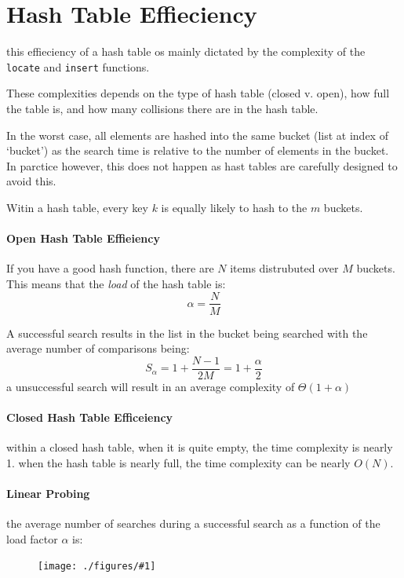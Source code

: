 \documentclass[12pt]{book}
\title{\coursetitle\linebreak\lecturename}
\author{\\Cain Susko\\ 
           \\ \\ \\
      Queen's University 
    \\School of Computing\\}
\newcommand{\incimg}[2]{%
       \begin{figure}[h]
               \centering
               \texttt{[image: ./figures/\#1]}
       \end{figure}
}
\begin{document}
\begin{titlepage}
        \maketitle
\end{titlepage}


\section*{Hash Table Effieciency}
this effieciency of a hash table os mainly dictated by the complexity of the \texttt{locate} and \texttt{insert} functions.

These complexities depends on the type of hash table (closed v. open), how full the table is, and how many collisions there are in the hash table.

In the worst case, all elements are hashed into the same bucket (list at index of `bucket') as the search time is relative to the number of 
elements in the bucket. In parctice however, this does not happen as hast tables are carefully designed to avoid this.

Witin a hash table, every key $k$ is equally likely to hash to the $m$ buckets.

\paragraph{Open Hash Table Effieiency}
If you have a good hash function, there are $N$ items distrubuted over $M$ buckets. This means that the \textit{load} of the hash table is:
\[ \alpha = \frac{N}{M}\]

A successful search results in the list in the bucket being searched with the average number of comparisons being:
\[S_\alpha = 1 + \frac{N-1}{2M} = 1 + \frac{\alpha}{2}\]
a unsuccessful search will result in an average complexity of 
$\Theta(1+\alpha)$

\paragraph{Closed Hash Table Efficeiency}
within a closed hash table, when it is quite empty, the time complexity is nearly 1. when the hash table is nearly full, the time complexity can be
nearly $O(N)$.

\paragraph{Linear Probing}
the average number of searches during a successful search as a function of the load factor $\alpha$ is:
\incimg{aAvg}{0.2}
\end{document}
